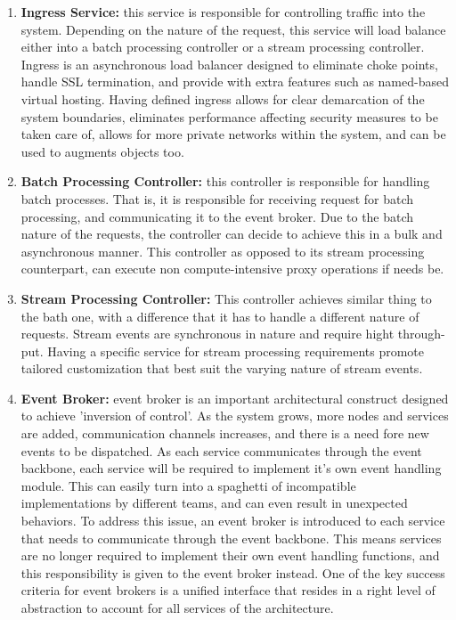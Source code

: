 \documentclass[runningheads]{llncs}
\begin{document}
\begin{enumerate}
    \item \textbf{Ingress Service:} this service is responsible for controlling traffic into the system. Depending on the nature of the request, this service will load balance either into a batch processing controller or a stream processing controller. Ingress is an asynchronous load balancer designed to eliminate choke points, handle SSL termination, and provide with extra features such as named-based virtual hosting. Having defined ingress allows for clear demarcation of the system boundaries, eliminates performance affecting security measures to be taken care of, allows for more private networks within the system, and can be used to augments objects too. 
    \item \textbf{Batch Processing Controller:} this controller is responsible for handling batch processes. That is, it is responsible for receiving request for batch processing, and communicating it to the event broker. Due to the batch nature of the requests, the controller can decide to achieve this in a bulk and asynchronous manner. This controller as opposed to its stream processing counterpart, can execute non compute-intensive proxy operations if needs be.
    \item \textbf{Stream Processing Controller:} This controller achieves similar thing to the bath one, with a difference that it has to handle a different nature of requests. Stream events are synchronous in nature and require hight through-put. Having a specific service for stream processing requirements promote tailored customization that best suit the varying nature of stream events. 
    \item \textbf{Event Broker:} event broker is an important architectural construct designed to achieve 'inversion of control'. As the system grows, more nodes and services are added, communication channels increases, and there is a need fore new events to be dispatched. As each service communicates through the event backbone, each service will be required to implement it's own event handling module. This can easily turn into a spaghetti of incompatible implementations by different teams, and can even result in unexpected behaviors. To address this issue, an event broker is introduced to each service that needs to communicate through the event backbone. This means services are no longer required to implement their own event handling functions, and this responsibility is given to the event broker instead. One of the key success criteria for event brokers is a unified interface that resides in a right level of abstraction to account for all services of the architecture.

\end{enumerate}
\end{document}
